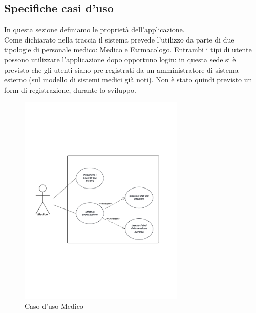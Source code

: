\documentclass{article}
\begin{document}
\subsection{Specifiche casi d'uso}
In questa sezione definiamo le proprietà dell'applicazione.\\
Come dichiarato nella traccia il sistema prevede l'utilizzo da parte di due tipologie di personale medico: Medico e Farmacologo. 
Entrambi i tipi di utente possono utilizzare l'applicazione dopo opportuno login: in questa sede si è previsto che gli utenti siano pre-registrati da un amministratore di sistema esterno (sul modello di sistemi medici già noti). Non è stato quindi previsto un form di registrazione, durante lo sviluppo.
\begin{figure}[htp]
    \centering
    \includegraphics[width=0.7\textwidth]{pictures/CasoDUsoMedico_SfondoTrasparente.png}
    \caption{Caso d'uso Medico}
\end{figure}
\end{document}
